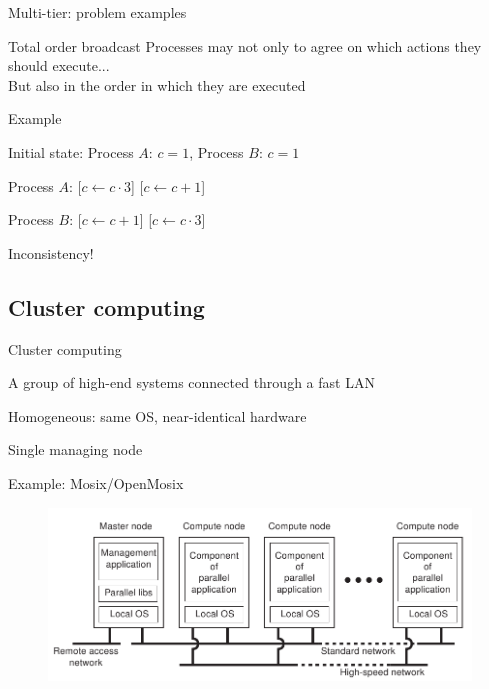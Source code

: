 \begin{frame}{Multi-tier: problem examples}
	
\begin{block}{Total order broadcast}
Processes may not only to agree on which actions they should execute...\\
But also in the order in which they are executed
\end{block}

\bigskip
Example
\BI
\item Initial state: Process $A$: $c=1$, Process $B$: $c=1$
\item Process $A$: [$c \gets c \cdot 3$] [$c \gets c+1$]
\item Process $B$: [$c \gets c+1$] [$c \gets c \cdot 3$]
\item Inconsistency! 
\EI
\end{frame}

\subsection{Cluster computing}

\begin{frame}{Cluster computing}
	
\BI
\item A group of high-end systems connected through a fast LAN
\item Homogeneous: same OS, near-identical hardware
\item Single managing node
\item Example: Mosix/OpenMosix
\EI

\begin{figure}
\includegraphics[width=\textwidth]{figs/01/cluster.png}	
\end{figure}

\end{frame}

